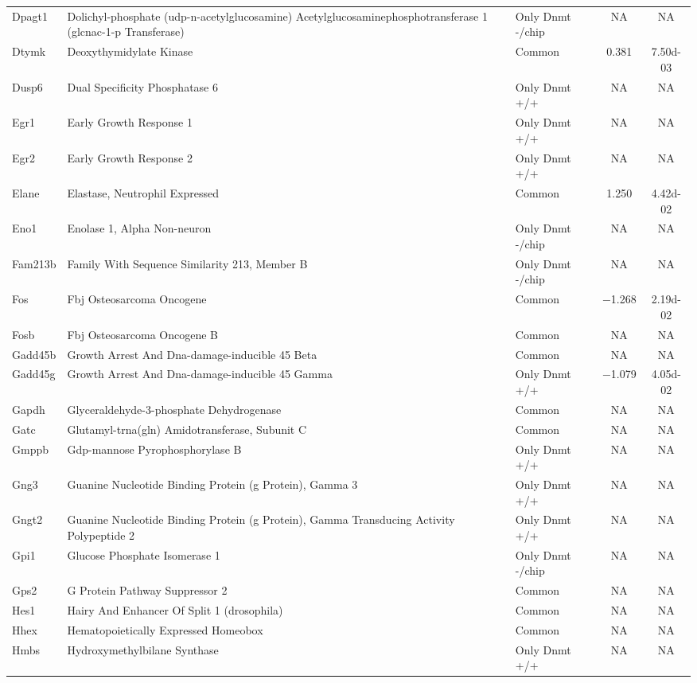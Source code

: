 {\begin{longtable}[l]{>{\raggedright}p{2.5cm}>{\raggedright}p{6cm}lcc}
Dpagt1	& Dolichyl-phosphate (udp-n-acetylglucosamine) Acetylglucosaminephosphotransferase 1 (glcnac-1-p Transferase)	& Only Dnmt -/chip	& NA	& NA\\ 
Dtymk	& Deoxythymidylate Kinase	& Common	& \num{ 0.381}	& \num{7.50d-03}\\ 
Dusp6	& Dual Specificity Phosphatase 6	& Only Dnmt +/+	& NA	& NA\\ 
Egr1	& Early Growth Response 1	& Only Dnmt +/+	& NA	& NA\\ 
Egr2	& Early Growth Response 2	& Only Dnmt +/+	& NA	& NA\\ 
Elane	& Elastase, Neutrophil Expressed	& Common	& \num{ 1.250}	& \num{4.42d-02}\\ 
Eno1	& Enolase 1, Alpha Non-neuron	& Only Dnmt -/chip	& NA	& NA\\ 
Fam213b	& Family With Sequence Similarity 213, Member B	& Only Dnmt -/chip	& NA	& NA\\ 
Fos	& Fbj Osteosarcoma Oncogene	& Common	& \num{-1.268}	& \num{2.19d-02}\\ 
Fosb	& Fbj Osteosarcoma Oncogene B	& Common	& NA	& NA\\ 
Gadd45b	& Growth Arrest And Dna-damage-inducible 45 Beta	& Common	& NA	& NA\\ 
Gadd45g	& Growth Arrest And Dna-damage-inducible 45 Gamma	& Only Dnmt +/+	& \num{-1.079}	& \num{4.05d-02}\\ 
Gapdh	& Glyceraldehyde-3-phosphate Dehydrogenase	& Common	& NA	& NA\\ 
Gatc	& Glutamyl-trna(gln) Amidotransferase, Subunit C	& Common	& NA	& NA\\ 
Gmppb	& Gdp-mannose Pyrophosphorylase B	& Only Dnmt +/+	& NA	& NA\\ 
Gng3	& Guanine Nucleotide Binding Protein (g Protein), Gamma 3	& Only Dnmt +/+	& NA	& NA\\ 
Gngt2	& Guanine Nucleotide Binding Protein (g Protein), Gamma Transducing Activity Polypeptide 2	& Only Dnmt +/+	& NA	& NA\\ 
Gpi1	& Glucose Phosphate Isomerase 1	& Only Dnmt -/chip	& NA	& NA\\ 
Gps2	& G Protein Pathway Suppressor 2	& Common	& NA	& NA\\ 
Hes1	& Hairy And Enhancer Of Split 1 (drosophila)	& Common	& NA	& NA\\ 
Hhex	& Hematopoietically Expressed Homeobox	& Common	& NA	& NA\\ 
Hmbs	& Hydroxymethylbilane Synthase	& Only Dnmt +/+	& NA	& NA\\ 

\end{longtable}}
